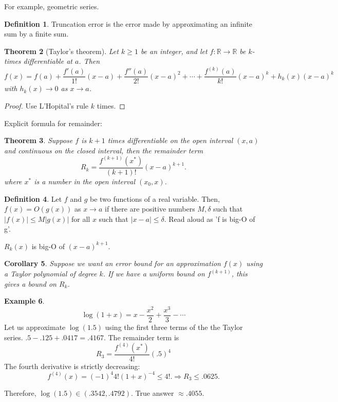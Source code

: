 \documentclass[12pt]{amsart}
\newtheorem{thm}{Theorem}[section]   %
\newtheorem{cor}[thm]{Corollary}     %
\theoremstyle{definition}
\newtheorem{defn}[thm]{Definition}   %
\newtheorem{ex}[thm]{Example}        %
\newcommand{\RR}{\ensuremath{\mathbb{R}}}
\begin{document}
For example, geometric series.

\begin{defn}
Truncation error is the error made by approximating an infinite sum
by a finite sum.
\end{defn}

\begin{thm}[Taylor's theorem]
Let $k \geq 1$ be an integer, and let $f : \RR \to \RR$ be $k$-times
differentiable at $a$. Then
\[
f(x) = f(a) + \dfrac{f'(a)}{1!}(x-a) + \dfrac{f''(a)}{2!}(x-a)^2 + \cdots
+ \dfrac{f^{(k)}(a)}{k!}(x-a)^k + h_k(x) ( x- a)^{k}
\]
with $h_k(x) \to 0$ as $x \to a$.
\end{thm}

\begin{proof}
Use L'Hopital's rule $k$ times.
\end{proof}

Explicit formula for remainder:

\begin{thm}
Suppose $f$ is $k+1$ times differentiable on the open
interval $(x,a)$ and continuous on the closed interval, then the remainder term 
\[ R_k = \dfrac{f^{(k+1)}(x^*)}{(k+1)!} (x - a)^{k+1}.\]
where $x^*$ is a number in the open interval $(x_0,x)$.
\end{thm}

\begin{defn}
Let $f$ and $g$ be two functions of a real variable.
Then, $f(x) = O(g(x))$ as $x \to a$ if there are positive
numbers $M,\delta$ such that
$|f(x)| \leq M|g(x)|$ for all $x$ such that $|x -a| \leq \delta$.
Read aloud as 'f is big-O of g'.
\end{defn}

$R_k(x)$ is big-O of $(x-a)^{k+1}$.

\begin{cor}
Suppose we want an error bound for an approximation
$f(x)$ using a Taylor polynomial of degree $k$. If we
have a uniform bound on $f^{(k+1)}$, this gives a bound
on $R_k$.
\end{cor}

\begin{ex}
\[
\log(1+x) = x - \dfrac{x^2}{2} + \dfrac{x^3}{3} - \cdots
\]
Let us approximate $\log(1.5)$ using the first three terms of the the
Taylor series. $.5 - .125 + .0417 = .4167$. The remainder term
is
\[R_3 = \dfrac{f^{(4)}(x^*)}{4!} (.5)^4\]
The fourth derivative is strictly decreasing:
\[ f^{(4)}(x) = (-1)^4 4! (1+x)^{-4}  \leq 4!. \Rightarrow R_3 \leq .0625.\]

Therefore, $\log(1.5) \in (.3542,.4792)$. True answer $\approx .4055$.
\end{ex}
\end{document}
